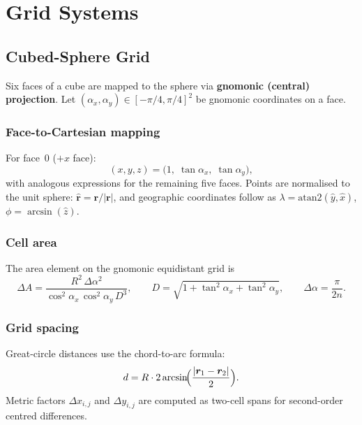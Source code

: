 \documentclass[11pt,a4paper]{article}
\begin{document}
\section{Grid Systems}

\subsection{Cubed-Sphere Grid}

Six faces of a cube are mapped to the sphere via \textbf{gnomonic (central) projection}.  Let $(\alpha_x,\alpha_y)\in[-\pi/4,\pi/4]^2$ be gnomonic coordinates on a face.

\subsubsection{Face-to-Cartesian mapping}
For face~0 ($+x$ face):
\begin{equation}
  (x,y,z) = \bigl(1,\;\tan\alpha_x,\;\tan\alpha_y\bigr),
\end{equation}
with analogous expressions for the remaining five faces.  Points are normalised to the unit sphere: $\hat{\bm r}=\bm r/|\bm r|$, and geographic coordinates follow as $\lambda=\mathrm{atan2}(\hat y,\hat x)$, $\phi=\arcsin(\hat z)$.

\subsubsection{Cell area}
The area element on the gnomonic equidistant grid is
\begin{equation}
  \Delta A = \frac{R^2\,\Delta\alpha^2}{\cos^2\!\alpha_x\,\cos^2\!\alpha_y\,D^3},
  \qquad D = \sqrt{1+\tan^2\!\alpha_x+\tan^2\!\alpha_y},
  \qquad \Delta\alpha=\frac{\pi}{2n}.
\end{equation}

\subsubsection{Grid spacing}
Great-circle distances use the chord-to-arc formula:
\begin{equation}
  d = R\cdot 2\arcsin\!\Bigl(\frac{|\bm r_1-\bm r_2|}{2}\Bigr).
\end{equation}
Metric factors $\Delta x_{i,j}$ and $\Delta y_{i,j}$ are computed as two-cell spans for second-order centred differences.
\end{document}
